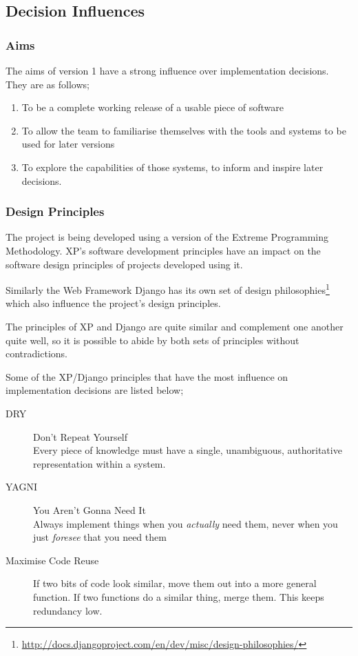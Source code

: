 
\subsection{Decision Influences}

\subsubsection{Aims}

The aims of version 1 have a strong influence over implementation decisions. They are as follows;

\begin{enumerate}
\item To be a complete working release of a usable piece of software
\item To allow the team to familiarise themselves with the tools and systems to be used for later versions
\item To explore the capabilities of those systems, to inform and inspire later decisions.
\end{enumerate}


\subsubsection{Design Principles}

The project is being developed using a version of the Extreme Programming Methodology. XP's software development principles have an impact on the software design principles of projects developed using it.

Similarly the Web Framework Django has its own set of design philosophies\footnote{\url{http://docs.djangoproject.com/en/dev/misc/design-philosophies/}} which also influence the project's design principles.

The principles of XP and Django are quite similar and complement one another quite well, so it is possible to abide by both sets of principles without contradictions.

Some of the XP/Django principles that have the most influence on implementation decisions are listed below;

\begin{description}
\item[DRY] Don't Repeat Yourself \\
Every piece of knowledge must have a single, unambiguous, authoritative representation within a system.
\item[YAGNI] You Aren't Gonna Need It \\
Always implement things when you \textit{actually} need them, never when you just \textit{foresee} that you need them
\item[Maximise Code Reuse] If two bits of code look similar, move them out into a more general function. If two functions do a similar thing, merge them. This keeps redundancy low.
\end{description}


